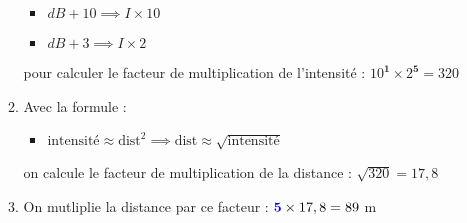 \documentclass[class=article, crop=false]{standalone}
\begin{document}
\begin{enumerate}
\begin{example}
\begin{enumerate}
\begin{itemize}
                \item $ dB + 10 \implies I \times 10 $
                \item $ dB + 3 \implies I \times 2 $
            \end{itemize}
            pour calculer le facteur de multiplication de l'intensité : $ 10^\textbf{1} \times 2^\textbf{5} = 320 $
            \item Avec la formule :
            \begin{itemize}
                \item $ \text{intensité} \approx \text{dist}^2 \implies \text{dist} \approx \sqrt{\text{intensité}} $
            \end{itemize}
            on calcule le facteur de multiplication de la distance : $ \sqrt{320} = 17,8 $
            \item On mutliplie la distance par ce facteur : $ \textcolor{blue}{\textbf{5}} \times 17,8 = 89 $ m
        \end{enumerate}
    \end{example}
\end{enumerate}
\end{document}
